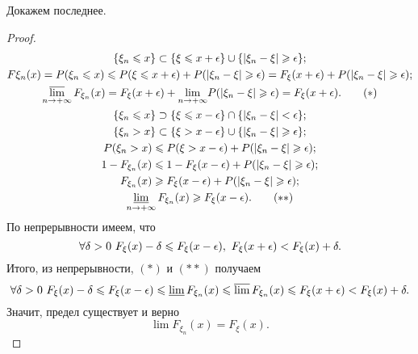     Докажем последнее.
    
     \begin{proof}
     \begin{gather*}
         \{\xi_n\leqslant x\} \subset \{\xi\leqslant x+\epsilon\}\cup \{\lvert\xi_n - \xi\rvert\geqslant \epsilon\}; \\
         F\xi_n (x) = P(\xi_n\leqslant x) \leqslant P(\xi\leqslant x+\epsilon) +P(\lvert\xi_n - \xi\rvert\geqslant\epsilon) = F_\xi(x + \epsilon) + P(\lvert\xi_n - \xi\rvert\geqslant \epsilon); \\
         \varlimsup_{n\rightarrow +\infty} F_{\xi_n}(x) = F_\xi (x + \epsilon) +
             \underset{n\rightarrow +\infty}{\lim} P(\lvert\xi_n - \xi\rvert\geqslant\epsilon) = F_\xi(x+\epsilon). \label{eq:ier1}\tag{$*$}\\
        \{\xi_n \leqslant x\} \supset \{\xi\leqslant x - \epsilon\}\cap \{\lvert\xi_n - \xi\rvert< \epsilon\};\\
        \{\xi_n >x\}\subset \{\xi > x - \epsilon\} \cup \{\lvert\xi_n - \xi\rvert \geqslant\epsilon\};\\
        P(\xi_n > x) \leqslant P(\xi > x-\epsilon) + P(\lvert\xi_n - \xi\rvert\geqslant\epsilon); \\
        1 - F_{\xi_n}(x)\leqslant 1-F_\xi(x-\epsilon) +P(\lvert\xi_n - \xi\rvert\geqslant\epsilon);\\
        F_{\xi_n}(x) \geqslant F_\xi (x - \epsilon) + P(\lvert\xi_n - \xi\rvert\geqslant\epsilon);\\
        \varliminf_{n \to +\infty} F_{\xi_n}(x)  \geqslant F_\xi (x-\epsilon).\label{eq:ier2}\tag{$**$}
     \end{gather*}
        По непрерывности имеем, что
        $$\forall \delta > 0 \ F_\xi(x) - \delta \leqslant F_\xi (x - \epsilon) , \ F_\xi(x+\epsilon) < F_\xi(x) + \delta.$$
         Итого, из непрерывности,  $(*)$ и $(**)$ получаем $$\forall \delta > 0 \ F_\xi(x) - \delta \leqslant F_\xi (x - \epsilon)\leqslant
             \varliminf F_{\xi_n}(x) \leqslant \varlimsup F_{\xi_n}(x) \leqslant F_\xi(x+\epsilon) < F_\xi(x) + \delta.$$
        Значит, предел существует и верно
        $$\lim F_{\xi_n}(x) = F_\xi (x).$$
     \end{proof}\newpage
